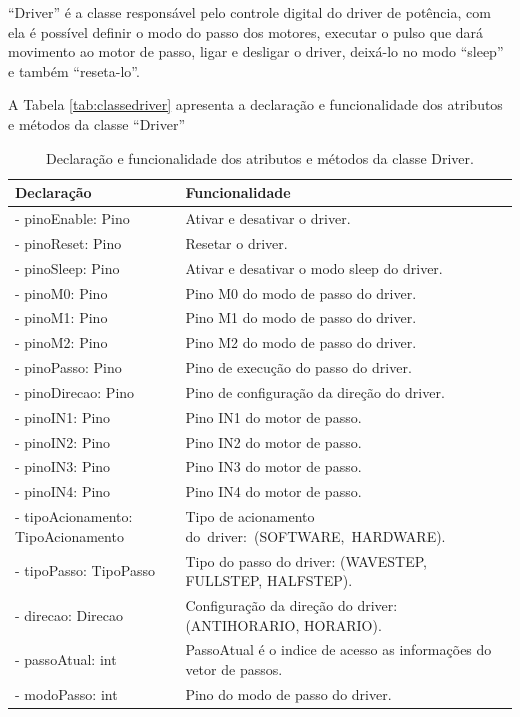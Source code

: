 “Driver” é a classe responsável pelo controle digital do driver de potência, com ela é possível definir 
o modo do passo dos motores, executar o pulso que dará movimento ao motor de passo, ligar e desligar 
o driver, deixá-lo no modo “sleep” e também “reseta-lo”.

A Tabela \ref{tab:classedriver} apresenta a declaração e funcionalidade dos atributos e métodos da 
classe “Driver”

\begin{table}[H]
    \centering
    \caption{Declaração e funcionalidade dos atributos e métodos da classe Driver.}
    \begin{tabular}{p{8cm}p{6cm}}
        \hline
        \textbf{Declaração} & \textbf{Funcionalidade}\\
        \hline
        - pinoEnable: Pino & Ativar e desativar o driver.\\
        - pinoReset: Pino & Resetar o driver.\\
        - pinoSleep: Pino & Ativar e desativar o modo sleep do driver.\\
        - pinoM0: Pino & Pino M0 do modo de passo do driver.\\
        - pinoM1: Pino & Pino M1 do modo de passo do driver.\\
        - pinoM2: Pino & Pino M2 do modo de passo do driver.\\
        - pinoPasso: Pino & Pino de execução do passo do driver.\\
        - pinoDirecao: Pino & Pino de configuração da direção do driver.\\
        - pinoIN1: Pino & Pino IN1 do motor de passo.\\
        - pinoIN2: Pino & Pino IN2 do motor de passo.\\
        - pinoIN3: Pino & Pino IN3 do motor de passo.\\
        - pinoIN4: Pino & Pino IN4 do motor de passo.\\
        - tipoAcionamento: TipoAcionamento & Tipo de acionamento do~driver:~(SOFTWARE,~HARDWARE).\\
        - tipoPasso: TipoPasso & Tipo do passo do driver: (WAVESTEP, FULLSTEP, HALFSTEP).\\
        - direcao: Direcao & Configuração da direção do driver: (ANTIHORARIO, HORARIO).\\
        - passoAtual: int & PassoAtual é o indice de acesso as informações do vetor de passos.\\
        - modoPasso: int & Pino do modo de passo do driver.\\

\end{tabular}
\end{table}
